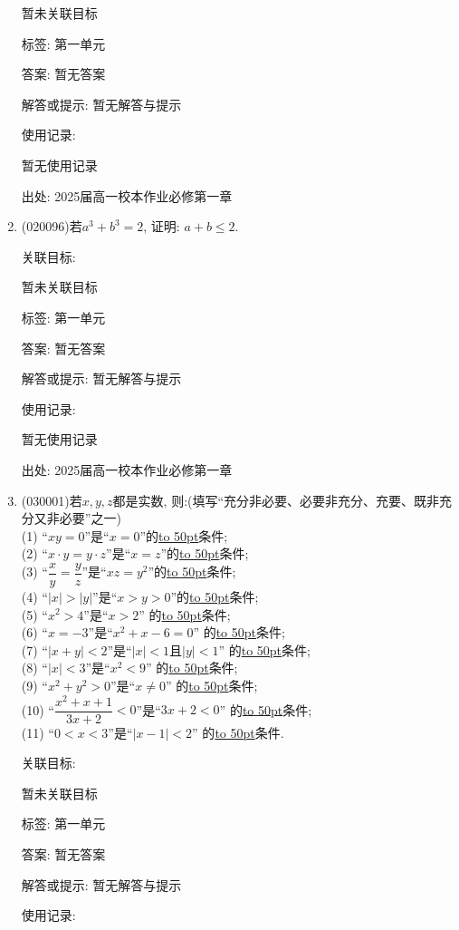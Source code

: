 \documentclass[10pt,a4paper]{article}
\newcommand{\blank}[1]{\underline{\hbox to #1pt{}}}
\begin{document}
\begin{enumerate}[1.]
暂未关联目标



标签: 第一单元

答案: 暂无答案

解答或提示: 暂无解答与提示

使用记录:

暂无使用记录


出处: 2025届高一校本作业必修第一章
\item { (020096)}若$a^3+b^3=2$, 证明: $a+b\le 2$.


关联目标:

暂未关联目标



标签: 第一单元

答案: 暂无答案

解答或提示: 暂无解答与提示

使用记录:

暂无使用记录


出处: 2025届高一校本作业必修第一章
\item { (030001)}若$x,y,z$都是实数, 则:(填写``充分非必要、必要非充分、充要、既非充分又非必要''之一)\\
(1) ``$xy=0$''是``$x=0$''的\blank{50}条件;\\
(2) ``$x\cdot y=y\cdot z$''是``$x=z$''的\blank{50}条件;\\
(3) ``$\dfrac xy=\dfrac yz$''是``$xz=y^2$''的\blank{50}条件;\\
(4) ``$|x |>| y|$''是``$x>y>0$''的\blank{50}条件;\\
(5) ``$x^2>4$''是``$x>2$'' 的\blank{50}条件;\\
(6) ``$x=-3$''是``$x^2+x-6=0$'' 的\blank{50}条件;\\
(7) ``$|x+y|<2$''是``$|x|<1$且$|y|<1$'' 的\blank{50}条件;\\
(8) ``$|x|<3$''是``$x^2<9$'' 的\blank{50}条件;\\
(9) ``$x^2+y^2>0$''是``$x\ne 0$'' 的\blank{50}条件;\\
(10) ``$\dfrac{x^2+x+1}{3x+2}<0$''是``$3x+2<0$'' 的\blank{50}条件;\\
(11) ``$0<x<3$''是``$|x-1|<2$'' 的\blank{50}条件.


关联目标:

暂未关联目标



标签: 第一单元

答案: 暂无答案

解答或提示: 暂无解答与提示

使用记录:


\end{enumerate}
\end{document}
